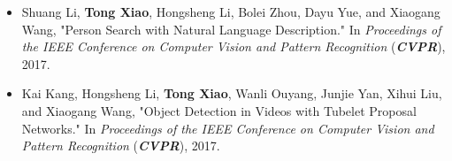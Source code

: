 \begin{itemize}
  \item Shuang Li, \textbf{Tong Xiao}, Hongsheng Li, Bolei Zhou, Dayu Yue, and Xiaogang Wang, "Person Search with Natural Language Description." In \textit{Proceedings of the IEEE Conference on Computer Vision and Pattern Recognition} (\textit{\textbf{CVPR}}), 2017.

  \item Kai Kang, Hongsheng Li, \textbf{Tong Xiao}, Wanli Ouyang, Junjie Yan, Xihui Liu, and Xiaogang Wang, "Object Detection in Videos with Tubelet Proposal Networks." In \textit{Proceedings of the IEEE Conference on Computer Vision and Pattern Recognition} (\textit{\textbf{CVPR}}), 2017.

\end{itemize}
